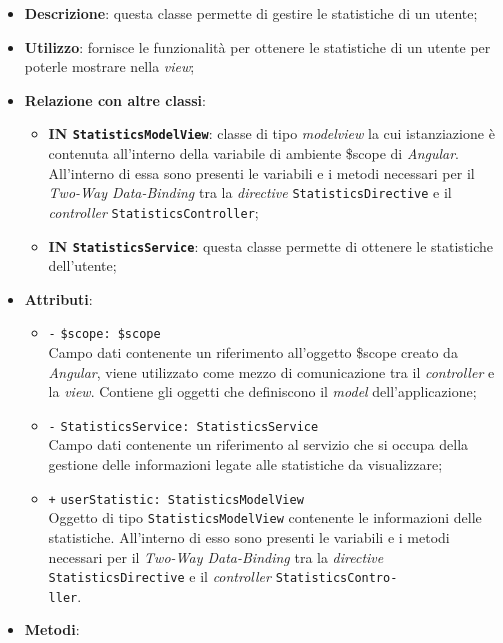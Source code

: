 \begin{itemize}
	\item \textbf{Descrizione}: questa classe permette di gestire le statistiche di un utente;
	\item \textbf{Utilizzo}: fornisce le funzionalità per ottenere le statistiche di un utente per poterle mostrare nella \textit{view};
	\item \textbf{Relazione con altre classi}:
	\begin{itemize}
		\item \textbf{IN \texttt{StatisticsModelView}}: classe di tipo \textit{modelview} la cui istanziazione è contenuta all'interno della variabile di ambiente \$scope di \textit{Angular}. All'interno di essa sono presenti le variabili e i metodi necessari per il \textit{Two-Way Data-Binding} tra la \textit{directive} \texttt{StatisticsDirective} e il \textit{controller} \texttt{StatisticsController}; 
		\item \textbf{IN \texttt{StatisticsService}}: questa classe permette di ottenere le statistiche dell'utente;
	\end{itemize}
	\item \textbf{Attributi}:
	\begin{itemize}
		\item \texttt{-} \texttt{\$scope: \$scope} \\
		Campo dati contenente un riferimento all'oggetto \$scope creato da \textit{Angular}, viene utilizzato come mezzo di comunicazione tra il \textit{controller} e la \textit{view}. Contiene gli oggetti che definiscono il \textit{model} dell'applicazione;
		\item \texttt{-} \texttt{StatisticsService: StatisticsService} \\
		Campo dati contenente un riferimento al servizio che si occupa della gestione delle informazioni legate alle statistiche da visualizzare;
		\item \texttt{+} \texttt{userStatistic: StatisticsModelView} \\ Oggetto di tipo \texttt{StatisticsModelView} contenente le informazioni delle statistiche. All'interno di esso sono presenti le variabili e i metodi necessari per il \textit{Two-Way Data-Binding} tra la \textit{directive} \texttt{StatisticsDirective} e il \textit{controller} \texttt{StatisticsContro-\\ller}.
	\end{itemize}	
	\item \textbf{Metodi}:

\end{itemize}
